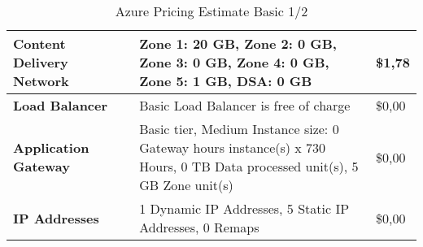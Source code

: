 \begin{landscape}
\begin{table}[]
\begin{tabularx}{\linewidth}{|l|X|X|X|}
                \textbf{Content Delivery Network} &                           & Zone 1: 20 GB, Zone 2: 0 GB, Zone 3: 0 GB, Zone 4: 0 GB, Zone 5: 1 GB, DSA: 0 GB                                                                                                                                                                 & \$1,78                                   \\ \hline
                \textbf{Load Balancer}            &                           & Basic Load Balancer is free of charge                                                                                                                                                                                                            & \$0,00                                   \\ \hline
                \textbf{Application Gateway}      &                           & Basic tier, Medium Instance size: 0 Gateway hours instance(s) x 730 Hours, 0 TB Data processed unit(s), 5 GB Zone unit(s)                                                                                                                        & \$0,00                                   \\ \hline
                \textbf{IP Addresses}             &                           & 1 Dynamic IP Addresses, 5 Static IP Addresses, 0 Remaps                                                                                                                                                                                          & \$0,00                                   \\ \hline
                \end{tabularx}
                \caption{Azure Pricing Estimate Basic 1/2}
                \label{azPriceT1_1}
        \end{table}
\end{landscape}